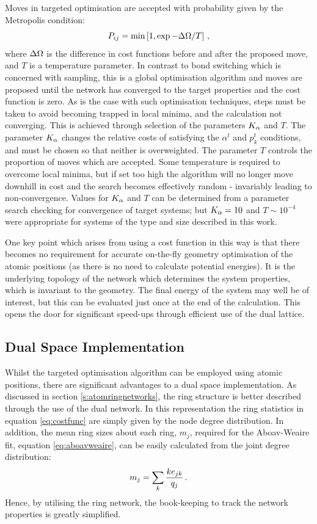 Moves in targeted optimisation are accepted with probability given by the Metropolis condition:
\begin{equation}
	P_{ij}=\min\left[1,\exp{-\Delta\Omega/T}\right]\,,
\end{equation}
where $\Delta\Omega$ is the difference in cost functions before and after the proposed move, and $T$ is a temperature parameter. 
In contrast to bond switching which is concerned with sampling, this is a global optimisation algorithm and moves are proposed until the network has converged to the target properties and the cost function is zero.
As is the case with such optimisation techniques, steps must be taken to avoid becoming trapped in local minima, and the calculation not converging. 
This is achieved through selection of the parameters $K_\alpha$ and $T$. 
The parameter $K_\alpha$ changes the relative costs of satisfying the $\alpha^t$ and $p_k^t$ conditions, and must be chosen so that neither is overweighted. The parameter $T$ controls the proportion of moves which are accepted. 
Some temperature is required to overcome local minima, but if set too high the algorithm will no longer move downhill in cost and the search becomes effectively random \-- invariably leading to non\--convergence. 
Values for $K_\alpha$ and $T$ can be determined from a parameter search checking for convergence of target systems; but $K_\alpha=10$ and $T\sim 10^{-4}$ were appropriate for systems of the type and size described in this work. 

One key point which arises from using a cost function in this way is that there becomes no requirement for accurate on\--the\--fly geometry optimisation of the atomic positions (as there is no need to calculate potential energies).
It is the underlying topology of the network which determines the system properties, which is invariant to the geometry.
The final energy of the system may well be of interest, but this can be evaluated just once at the end of the calculation.
This opens the door for significant speed\--ups through efficient use of the dual lattice.

\subsection{Dual Space Implementation}

Whilst the targeted optimisation algorithm can be employed using atomic positions, there are significant advantages to a dual space implementation.
As discussed in section \ref{s:atomringnetworks}, the ring structure is better described through the use of the dual network. 
In this representation the ring statistics in equation \eqref{eq:costfunc} are simply given by the node degree distribution. 
In addition, the mean ring sizes about each ring, $m_j$, required for the Aboav\--Weaire fit, equation \eqref{eq:aboavweaire}, can be easily calculated from the joint degree distribution:
\begin{equation}
	\label{eq:mjejklink}
	m_j = \sum\limits_k \frac{ke_{jk}}{q_j}\,.
\end{equation}
Hence, by utilising the ring network, the book\--keeping to track the network properties is greatly simplified.

